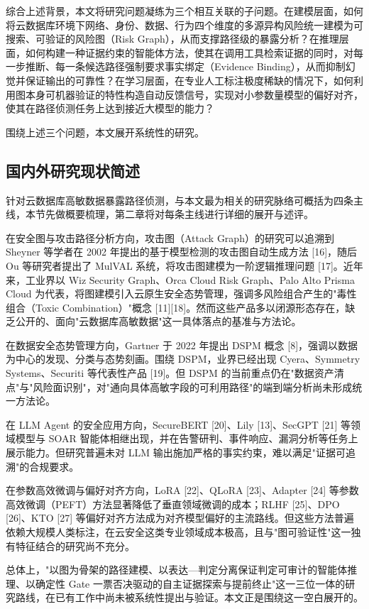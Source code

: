 \documentclass[a4paper,12pt]{ctexart}
\begin{document}
综合上述背景，本文将研究问题凝练为三个相互关联的子问题。在建模层面，如何将云数据库环境下网络、身份、数据、行为四个维度的多源异构风险统一建模为可搜索、可验证的风险图（Risk Graph），从而支撑路径级的暴露分析？在推理层面，如何构建一种证据约束的智能体方法，使其在调用工具检索证据的同时，对每一步推断、每一条候选路径强制要求事实绑定（Evidence Binding），从而抑制幻觉并保证输出的可靠性？在学习层面，在专业人工标注极度稀缺的情况下，如何利用图本身可机器验证的特性构造自动反馈信号，实现对小参数量模型的偏好对齐，使其在路径侦测任务上达到接近大模型的能力？

围绕上述三个问题，本文展开系统性的研究。

\subsection{国内外研究现状简述}

针对云数据库高敏数据暴露路径侦测，与本文最为相关的研究脉络可概括为四条主线，本节先做概要梳理，第二章将对每条主线进行详细的展开与述评。

在安全图与攻击路径分析方向，攻击图（Attack Graph）的研究可以追溯到 Sheyner 等学者在 2002 年提出的基于模型检测的攻击图自动生成方法 [16]，随后 Ou 等研究者提出了 MulVAL 系统，将攻击图建模为一阶逻辑推理问题 [17]。近年来，工业界以 Wiz Security Graph、Orca Cloud Risk Graph、Palo Alto Prisma Cloud 为代表，将图建模引入云原生安全态势管理，强调多风险组合产生的"毒性组合（Toxic Combination）"概念 [11][18]。然而这些产品多以闭源形态存在，缺乏公开的、面向"云数据库高敏数据"这一具体落点的基准与方法论。

在数据安全态势管理方向，Gartner 于 2022 年提出 DSPM 概念 [8]，强调以数据为中心的发现、分类与态势刻画。围绕 DSPM，业界已经出现 Cyera、Symmetry Systems、Securiti 等代表性产品 [19]。但 DSPM 的当前重点仍在"数据资产清点"与"风险面识别"，对"通向具体高敏字段的可利用路径"的端到端分析尚未形成统一方法论。

在 LLM Agent 的安全应用方向，SecureBERT [20]、Lily [13]、SecGPT [21] 等领域模型与 SOAR 智能体相继出现，并在告警研判、事件响应、漏洞分析等任务上展示能力。但研究普遍未对 LLM 输出施加严格的事实约束，难以满足"证据可追溯"的合规要求。

在参数高效微调与偏好对齐方向，LoRA [22]、QLoRA [23]、Adapter [24] 等参数高效微调（PEFT）方法显著降低了垂直领域微调的成本；RLHF [25]、DPO [26]、KTO [27] 等偏好对齐方法成为对齐模型偏好的主流路线。但这些方法普遍依赖大规模人类标注，在云安全这类专业领域成本极高，且与"图可验证性"这一独有特征结合的研究尚不充分。

总体上，"以图为骨架的路径建模、以表达—判定分离保证判定可审计的智能体推理、以确定性 Gate 一票否决驱动的自主证据探索与提前终止"这一三位一体的研究路线，在已有工作中尚未被系统性提出与验证。本文正是围绕这一空白展开的。
\end{document}
